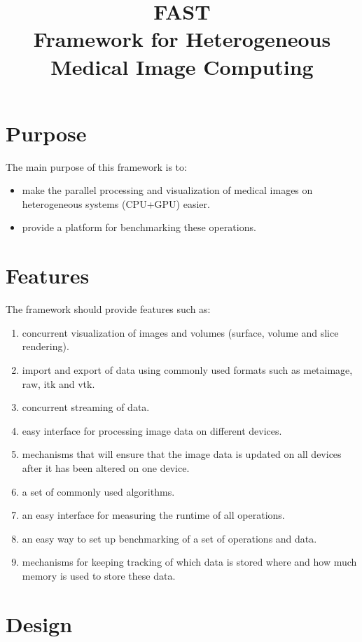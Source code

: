 \documentclass{article}
\title{FAST\\Framework for Heterogeneous Medical Image Computing}
\date{}
\begin{document}
\maketitle

\section{Purpose}

The main purpose of this framework is to:
\begin{itemize}
    \itemsep 1pt
    \item make the parallel processing and visualization of medical images on heterogeneous systems (CPU+GPU) easier.
    \item provide a platform for benchmarking these operations.
\end{itemize}

\section{Features}

The framework should provide features such as:
\begin{enumerate}
    \itemsep 1pt
    \item concurrent visualization of images and volumes (surface, volume and slice rendering).
    \item import and export of data using commonly used formats such as metaimage, raw, itk and vtk.
    \item concurrent streaming of data.
    \item easy interface for processing image data on different devices. 
    \item mechanisms that will ensure that the image data is updated on all devices after it has been altered on one device.
    \item a set of commonly used algorithms.
    \item an easy interface for measuring the runtime of all operations.
    \item an easy way to set up benchmarking of a set of operations and data.
    \item mechanisms for keeping tracking of which data is stored where and how much memory is used to store these data.
\end{enumerate}

\section{Design}
\end{document}
